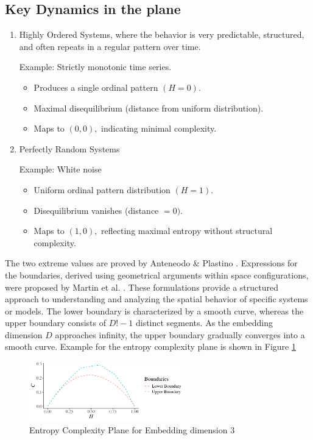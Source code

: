 \subsection{Key Dynamics in the plane}
\begin{enumerate}
	\item Highly Ordered Systems, where the behavior is very predictable, structured, and often repeats in a regular pattern over time.
	
	Example: Strictly monotonic time series.
	\begin{itemize}
		\item Produces a single ordinal pattern $(H=0)$.
		
		\item Maximal disequilibrium (distance from uniform distribution).
		
		\item Maps to $(0,0),$ indicating minimal complexity.
	\end{itemize}
	
	\item Perfectly Random Systems
	
	Example: White noise
	\begin{itemize}
		\item Uniform ordinal pattern distribution $(H=1)$.
		\item Disequilibrium vanishes (distance $=0)$.
		\item Maps to $(1,0),$ reflecting maximal entropy without structural complexity.
	\end{itemize}
\end{enumerate}
The two extreme values are proved by Anteneodo \& Plastino \cite{anteneodo1996some}.
Expressions for the boundaries, derived using geometrical arguments within space configurations, were proposed by Martin et al. \cite{Martin2006}. 
These formulations provide a structured approach to understanding and analyzing the spatial behavior of specific systems or models. The lower boundary is characterized by a smooth curve, whereas the upper boundary consists of $D!-1$ distinct segments. As the embedding dimension $D$ approaches infinity, the upper boundary gradually converges into a smooth curve. 
Example for the entropy complexity plane is shown in Figure \ref{fig:complexity}


\begin{figure}[H]
	\centering
	\includegraphics[width=0.6\textwidth]{complexity plane}
	\caption{Entropy Complexity Plane for Embedding dimension 3}
	\label{fig:complexity}
\end{figure}

